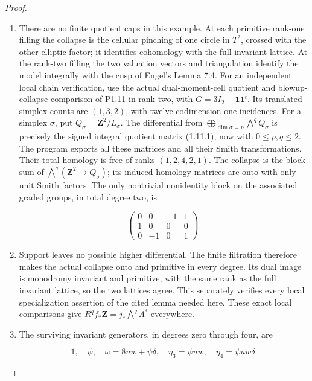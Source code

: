 \begin{proof}
\begin{enumerate}[label=\arabic*.]
\item There are no finite quotient caps in this example.  At each
primitive rank-one filling the collapse is the cellular pinching
of one circle in \(T^2\), crossed with the other elliptic factor;
it identifies cohomology with the full invariant lattice.  At
the rank-two filling the two valuation vectors and triangulation
identify the model integrally with the cusp of Engel's Lemma 7.4.
For an independent local chain verification, use the actual
dual-moment-cell quotient and blowup-collapse comparison of P1.11
in rank two, with \(G=3I_2-\mathbf1\mathbf1^t\).  Its translated
simplex counts are \((1,3,2)\), with twelve codimension-one
incidences.  For a simplex \(\sigma\), put
\(Q_\sigma=\mathbf Z^2/L_\sigma\).  The differential from
\(\bigoplus_{\dim\sigma=p}\bigwedge^q Q_\sigma\) is precisely
the signed integral quotient matrix (1.11.1), now with
\(0\leq p,q\leq2\).  The program
 exports all these matrices
and all their Smith transformations.  Their total homology is
free of ranks \((1,2,4,2,1)\).  The collapse is the block sum
of \(\bigwedge^q(\mathbf Z^2\to Q_\sigma)\); its induced
homology matrices are onto with only unit Smith factors.  The
only nontrivial nonidentity block on the associated graded groups,
in total degree two, is

\[
 \begin{pmatrix}0&0&-1&1\\1&0&0&0\\0&-1&0&1\end{pmatrix}.
\]

\item Support leaves no possible higher differential.  The finite
filtration therefore makes the actual collapse onto and primitive
in every degree.  Its dual image is monodromy invariant and
primitive, with the same rank as the full invariant lattice, so
the two lattices agree.  This separately verifies every local
specialization assertion of the cited lemma needed here.
These exact local comparisons
give \(R^qf_*\mathbf Z=j_*\bigwedge^q\Lambda^*\) everywhere.

\item The surviving invariant generators, in degrees zero through four,
are

\[
 1,\quad\psi,\quad\omega=8uw+\psi\delta,
 \quad\eta_3=\psi uw,\quad\eta_4=\psi uw\delta.
\]


\end{enumerate}
\end{proof}
